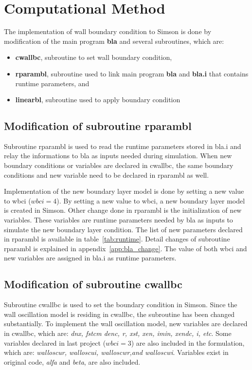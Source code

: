\section{Computational Method}
The implementation of wall boundary condition to Simson is done by modification of the main program {\bf bla} and several subroutines, which are:
\begin{itemize}
\item {\bf cwallbc}, subroutine to set wall boundary condition,
\item {\bf rparambl}, subroutine used to link main program {\bf bla} and {\bf bla.i} that contains runtime parameters, and \item {\bf linearbl}, subroutine used to apply boundary condition
\end{itemize}

\subsection{Modification of subroutine rparambl}
Subroutine rparambl is used to read the runtime parameters stored in bla.i and relay the informations to bla as inputs needed during simulation. When new boundary conditions or variables are declared in cwallbc, the same boundary conditions and new variable need to be declared in rparambl as well.

Implementation of the new boundary layer model is done by setting a new value to wbci ($wbci = 4$). By setting a new value to wbci, a new boundary layer model is created in Simson. Other change done in rparambl is the initialization of new variables. These variables are runtime parameters needed by bla as inputs to simulate the new boundary layer condition. The list of new parameters declared in rparambl is available in table~\ref{tab:runtime}. Detail changes of subroutine rparambl is explained in appendix~\ref{app:bla_change}. The value of both wbci and new variables are assigned in bla.i as runtime parameters.
 
\subsection{Modification of subroutine cwallbc}
Subroutine cwallbc is used to set the boundary condition in Simson. Since the wall oscillation model is residing in cwallbc, the subroutine has been changed substantially. To implement the wall oscillation model, new variables are declared in cwallbc, which are: \emph{dnx, fstcm denc, r, xst, xen, imin, xendc, i, etc}. Some variables declared in last project ($wbci = 3$) are also included in the formulation, which are: \emph{walloscur, walloscui, walloscwr,and walloscwi}. Variables exist in original code, \emph{alfa} and \emph{beta}, are also included.

